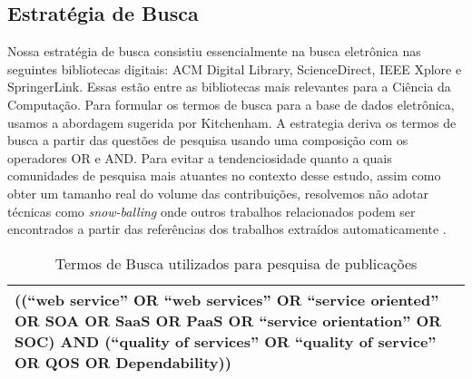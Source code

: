 \subsection{Estratégia de Busca}\label{estrategia_busca}
Nossa estratégia de busca consistiu essencialmente na busca eletrônica nas seguintes bibliotecas digitais: ACM Digital Library, ScienceDirect, IEEE Xplore e SpringerLink. Essas estão entre as bibliotecas mais relevantes para a Ciência da Computação. Para formular os termos de busca para a base de dados eletrônica, usamos a abordagem sugerida por Kitchenham\cite{Barbara Kitchenham}. A estrategia deriva os termos de busca a partir das questões de pesquisa  usando uma composição com os operadores OR e AND. Para evitar a tendenciosidade quanto a quais comunidades de pesquisa mais atuantes no contexto desse estudo, assim como obter um tamanho real do volume das contribuições, resolvemos não adotar técnicas como \emph{snow-balling} onde outros trabalhos relacionados podem ser encontrados a partir das referências dos trabalhos extraídos automaticamente \cite{VIDE Using Mapping Studies in Software Engineering (Proc. of PPIG 2008}.

\begin{table}[ht]
\centering
\caption{Termos de Busca utilizados para pesquisa de publicações}
\label{tab:exTable1}
\begin{tabular}{p{\linewidth}}
\hline
((``web service'' OR ``web services'' OR ``service oriented'' OR SOA OR SaaS OR PaaS OR ``service orientation'' OR SOC) AND (``quality of services'' OR ``quality of service'' OR QOS OR Dependability)) \\
\hline
\end{tabular}
\end{table}


